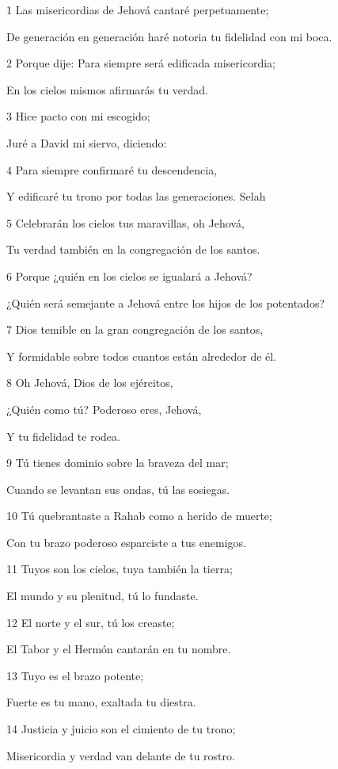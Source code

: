 \par 1 Las misericordias de Jehová cantaré perpetuamente;
\par De generación en generación haré notoria tu fidelidad con mi boca.
\par 2 Porque dije: Para siempre será edificada misericordia;
\par En los cielos mismos afirmarás tu verdad.
\par 3 Hice pacto con mi escogido;
\par Juré a David mi siervo, diciendo:
\par 4 Para siempre confirmaré tu descendencia,
\par Y edificaré tu trono por todas las generaciones.  Selah
\par 5 Celebrarán los cielos tus maravillas, oh Jehová,
\par Tu verdad también en la congregación de los santos.
\par 6 Porque ¿quién en los cielos se igualará a Jehová?
\par ¿Quién será semejante a Jehová entre los hijos de los potentados?
\par 7 Dios temible en la gran congregación de los santos,
\par Y formidable sobre todos cuantos están alrededor de él.
\par 8 Oh Jehová, Dios de los ejércitos,
\par ¿Quién como tú? Poderoso eres, Jehová,
\par Y tu fidelidad te rodea.
\par 9 Tú tienes dominio sobre la braveza del mar;
\par Cuando se levantan sus ondas, tú las sosiegas.
\par 10 Tú quebrantaste a Rahab como a herido de muerte;
\par Con tu brazo poderoso esparciste a tus enemigos.
\par 11 Tuyos son los cielos, tuya también la tierra;
\par El mundo y su plenitud, tú lo fundaste.
\par 12 El norte y el sur, tú los creaste;
\par El Tabor y el Hermón cantarán en tu nombre.
\par 13 Tuyo es el brazo potente;
\par Fuerte es tu mano, exaltada tu diestra.
\par 14 Justicia y juicio son el cimiento de tu trono;
\par Misericordia y verdad van delante de tu rostro.

